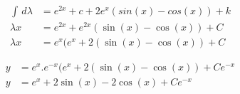 \begin{align*}
    \int \, d\lambda &= e^{2x} + c + 2e^x(sin(x) - cos(x)) + k \\
    \lambda x &= e^{2x} + e^{2x} (\sin(x) - \cos(x)) + C \\
    \lambda x &= e^{x} (e^{x} + 2(\sin(x) - \cos(x)) + C
\end{align*}

\begin{align*}
    y &= e^x.e^{-x} (e^{x} + 2(\sin(x) - \cos(x)) + Ce^{-x} \\
    y &= e^x + 2\sin(x) - 2\cos(x) + Ce^{-x}
\end{align*}
